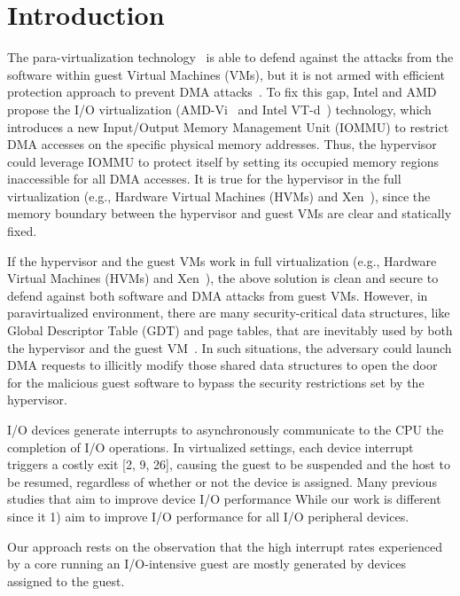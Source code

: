\section{Introduction} \label{sec:intro}
The para-virtualization technology~\cite{XEN-SOPS03,denali-paravirtualization} is able to defend against the attacks from the software within guest Virtual Machines (VMs), but it is not armed with efficient protection approach to prevent DMA attacks~\cite{disaggregation}. To fix this gap, Intel and AMD propose the I/O virtualization (AMD-Vi~\cite{amdvt} and Intel VT-d~\cite{intelvt}) technology, which introduces a new Input/Output Memory Management Unit (IOMMU) to restrict DMA accesses on the specific physical memory addresses. Thus, the hypervisor could leverage IOMMU to protect itself by setting its occupied memory regions inaccessible for all DMA accesses. It is true for the hypervisor in the full virtualization (e.g., Hardware Virtual Machines (HVMs) and Xen~\cite{XEN-SOPS03}), since the memory boundary between the hypervisor and guest VMs are clear and statically fixed.


If the hypervisor and the guest VMs work in full virtualization (e.g., Hardware Virtual Machines (HVMs) and Xen~\cite{XEN-SOPS03}), the above solution is clean and secure to defend against both software and DMA attacks from guest VMs. However, in paravirtualized environment, there are many security-critical data structures, like Global Descriptor Table (GDT) and page tables, that are inevitably used by both the hypervisor and the guest VM~\cite{A novel hardware assisted full virtualization technique?, I remeber one paper discussing about this}. In such situations, the adversary could launch DMA requests to illicitly modify those shared data structures to open the door for the malicious guest software to bypass the security restrictions set by the hypervisor.

I/O devices generate interrupts to asynchronously communicate
to the CPU the completion of I/O operations. In virtualized settings,
each device interrupt triggers a costly exit [2, 9, 26], causing the
guest to be suspended and the host to be resumed, regardless of
whether or not the device is assigned.
Many previous studies that aim to improve device I/O performance
While our work is different since it 1) aim to improve I/O performance for all I/O peripheral devices.

Our approach rests on the observation that the high interrupt
rates experienced by a core running an I/O-intensive guest are
mostly generated by devices assigned to the guest.

